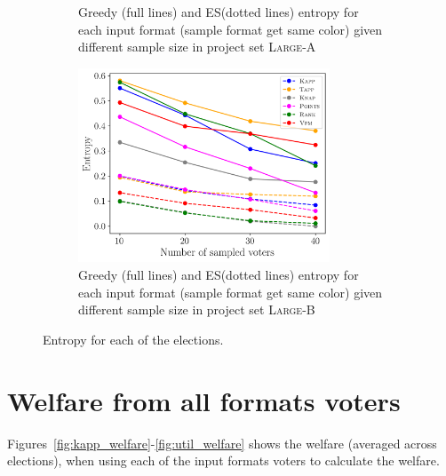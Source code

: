 \documentclass[letterpaper]{article} %
\newcommand{\knap}{\textsc{Knap}}
\newcommand{\kapp}{\textsc{Kapp}}
\newcommand{\mes}{ES}
\begin{document}
\begin{figure}[!h]
\begin{subfigure}[b]{0.45\textwidth}
\caption{Greedy (full lines) and \mes (dotted lines) entropy  for each input format (sample format get same color) given different sample size in project set \textsc{Large-A} }\label{fig:entropy_la}
     \end{subfigure}
     \hfill
     \begin{subfigure}[b]{0.45\textwidth}
         \centering
         \includegraphics[width=7.5cm]{experiment/entropy_large_b.png}
\caption{Greedy (full lines) and \mes (dotted lines) entropy  for each input format (sample format get same color) given different sample size in project set \textsc{Large-B} }\label{fig:entropy_lb}
     \end{subfigure}

        \caption{Entropy for each of the elections.}
        \label{fig:app_entropy}
\end{figure}


\section{Welfare from all formats voters}\label{app:aggregation}
Figures~\ref{fig:kapp_welfare}-\ref{fig:util_welfare} shows the welfare (averaged across elections), when using each of the input formats voters to calculate the welfare.



\end{document}
